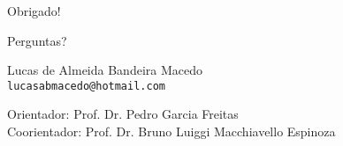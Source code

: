 \begin{frame}[plain]
\begin{center}
{\Huge Obrigado!}

\vspace{1cm}

{\Large Perguntas?}

\vspace{1cm}

Lucas de Almeida Bandeira Macedo\\
\texttt{lucasabmacedo@hotmail.com}

\vspace{0.5cm}

Orientador: Prof. Dr. Pedro Garcia Freitas\\
Coorientador: Prof. Dr. Bruno Luiggi Macchiavello Espinoza
\end{center}
\end{frame}
